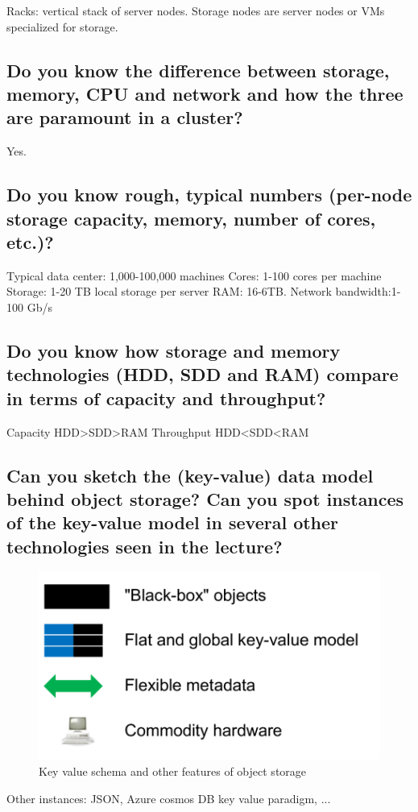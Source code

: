 \documentclass{article}
\begin{document}
Racks: vertical stack of server nodes. Storage nodes are server nodes or VMs specialized for storage.

\subsection{Do you know the difference between storage, memory, CPU and network and how the three are paramount in a cluster?}

Yes.

\subsection{Do you know rough, typical numbers (per-node storage capacity, memory, number of cores, etc.)?}

Typical data center: 1,000-100,000 machines
Cores: 1-100 cores per machine
Storage: 1-20 TB local storage per server
RAM: 16-6TB.
Network bandwidth:1-100 Gb/s

\subsection{Do you know how storage and memory technologies (HDD, SDD and RAM) compare in terms of capacity and throughput?}

Capacity HDD>SDD>RAM
Throughput HDD<SDD<RAM

\subsection{Can you sketch the (key-value) data model behind object storage? Can you spot instances of the key-value model in several other technologies seen in the lecture?}

\begin{figure}[H]
  \centering
  \includegraphics[width=.5\textwidth]{img/key_value_object_storage.png}
  \caption{Key value schema and other features of object storage}
  \label{fig:keyvalueobjectstorage}
\end{figure}

Other instances: JSON, Azure cosmos DB key value paradigm, ...
\end{document}
